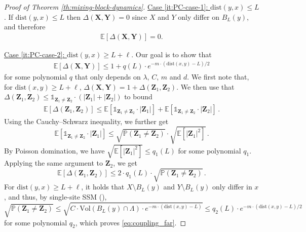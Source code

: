 \documentclass[10pt]{amsart}
\theoremstyle{definition}
\theoremstyle{remark}
\newcommand{\ind}[1]{\mathds{1}_{#1}}
\newcommand{\bX}{\mathbf{X}}
\newcommand{\bY}{\mathbf{Y}}
\newcommand{\bZ}{\mathbf{Z}}
\newcommand{\dist}{\mathrm{dist}}
\renewcommand{\P}{\mathbb{P}}
\newcommand{\E}{\mathbb{E}}
\newcommand{\region}{\Lambda}
\newcommand{\activity}{\lambda}
\newcommand{\size}[1]{\left\lvert#1\right\rvert}
\newcommand{\vol}{\mathrm{Vol}}
\begin{document}
\begin{proof}[Proof of Theorem \ref{th:mixing-block-dynamics}]
		\noindent    \underline{Case \ref{it:PC-case-1}: $\dist(y,x) \leq L$}. 
		If $\dist(y, x) \le L$ then $\Delta(\bX, \bY) = 0$ since $X$ and $Y$ only differ on $B_L(y)$, and therefore
		\begin{align}
			\E[\Delta(\bX, \bY)] = 0. \label{eq:coupling_close}
		\end{align}
		
		
		\noindent \underline{Case \ref{it:PC-case-2}: $\dist(y,x) \geq L + \ell$}.
		Our goal is to show that
		\begin{align}
			\E[\Delta(\bX, \bY)] \le 1 + q(L) \cdot e^{-m \cdot (\dist(x, y) - L) / 2 } \label{eq:coupling_far}
		\end{align}
		for some polynomial $q$ that only depends on $\activity$, $C$, $m$ and $d$.
		We first note that, for $\dist(x, y) \ge L + \ell$, $\Delta(\bX, \bY) = 1 + \Delta(\bZ_1, \bZ_2)$.
		We then use that $\Delta(\bZ_1, \bZ_2) \le \ind{\bZ_1 \neq \bZ_2} \cdot (\size{\bZ_1} + \size{\bZ_2})$ to bound
		\begin{align*}
			\E[\Delta(\bZ_1, \bZ_2)]
			\le \E[\ind{\bZ_1 \neq \bZ_2} \cdot \size{\bZ_1}] + \E[\ind{\bZ_1 \neq \bZ_2} \cdot \size{\bZ_2}] \,.
		\end{align*}
		Using the Cauchy--Schwarz inequality, we further get
		\[
		\E[\ind{\bZ_1 \neq \bZ_2} \cdot \size{\bZ_1}] \le \sqrt{\P(\bZ_1 \neq \bZ_2)} \cdot \sqrt{\E[\size{\bZ_1}^2 ]} \,.
		\]
		By Poisson domination, we  have $\sqrt{\E[\size{\bZ_1}^2]} \le q_1(L)$ for some polynomial $q_1$.
		Applying the same argument to $\bZ_2$, we get
		\[
		\E[\Delta(\bZ_1, \bZ_2)] \le 2 \cdot q_1(L) \cdot \sqrt{\P(\bZ_1 \neq \bZ_2)} \,.
		\]
		For $\dist(y, x) \ge L + \ell$, it holds that $X \setminus B_L(y)$ and $Y \setminus B_L(y)$ only differ in $x$, and thus, by single-site SSM (),
		\[
		\sqrt{\P(\bZ_1 \neq \bZ_2)}
		\le \sqrt{C \cdot \vol(B_L(y) \cap \region) \cdot e^{-m \cdot (\dist(x, y) - L)}} \le q_2(L) \cdot e^{-m \cdot (\dist(x, y) - L)/2}  \,
		\] 
		for some polynomial $q_2$, which proves \eqref{eq:coupling_far}.
		

\end{proof}
\end{document}
